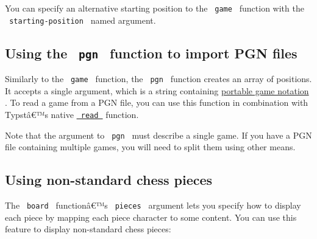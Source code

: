 \pandocbounded{}

You can specify an alternative starting position to the
\texttt{\ game\ } function with the \texttt{\ starting-position\ } named
argument.

\subsection{\texorpdfstring{Using the \texttt{\ pgn\ } function to
import PGN
files}{Using the  pgn  function to import PGN files}}\label{using-the-pgn-function-to-import-pgn-files}

Similarly to the \texttt{\ game\ } function, the \texttt{\ pgn\ }
function creates an array of positions. It accepts a single argument,
which is a string containing
\href{https://en.wikipedia.org/wiki/Portable_Game_Notation}{portable
game notation} . To read a game from a PGN file, you can use this
function in combination with Typstâ€™s native
\href{https://typst.app/docs/reference/data-loading/read/}{\texttt{\ read\ }}
function.

\begin{Shaded}
\begin{Highlighting}[]
\end{Highlighting}
\end{Shaded}

Note that the argument to \texttt{\ pgn\ } must describe a single game.
If you have a PGN file containing multiple games, you will need to split
them using other means.

\subsection{Using non-standard chess
pieces}\label{using-non-standard-chess-pieces}

The \texttt{\ board\ } functionâ€™s \texttt{\ pieces\ } argument lets
you specify how to display each piece by mapping each piece character to
some content. You can use this feature to display non-standard chess
pieces:

\begin{Shaded}
\begin{Highlighting}[]
\NormalTok{  ),}
\NormalTok{)}
\end{Highlighting}
\end{Shaded}

